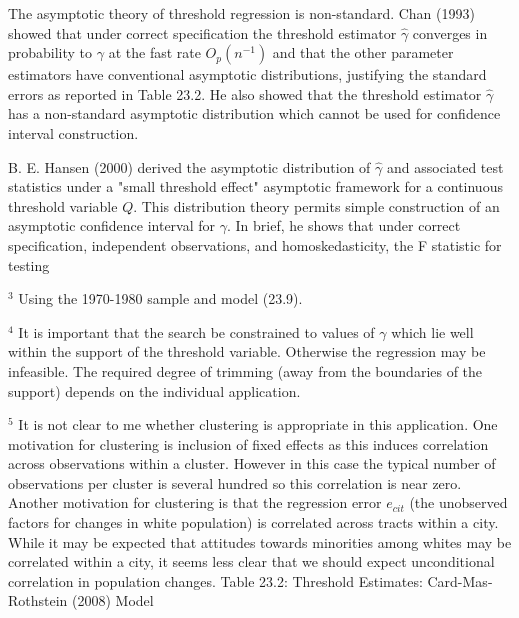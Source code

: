 \documentclass[10pt]{article}
\begin{document}
The asymptotic theory of threshold regression is non-standard. Chan (1993) showed that under correct specification the threshold estimator $\widehat{\gamma}$ converges in probability to $\gamma$ at the fast rate $O_{p}\left(n^{-1}\right)$ and that the other parameter estimators have conventional asymptotic distributions, justifying the standard errors as reported in Table 23.2. He also showed that the threshold estimator $\widehat{\gamma}$ has a non-standard asymptotic distribution which cannot be used for confidence interval construction.

B. E. Hansen (2000) derived the asymptotic distribution of $\widehat{\gamma}$ and associated test statistics under a "small threshold effect" asymptotic framework for a continuous threshold variable $Q$. This distribution theory permits simple construction of an asymptotic confidence interval for $\gamma$. In brief, he shows that under correct specification, independent observations, and homoskedasticity, the F statistic for testing

${ }^{3}$ Using the 1970-1980 sample and model (23.9).

${ }^{4}$ It is important that the search be constrained to values of $\gamma$ which lie well within the support of the threshold variable. Otherwise the regression may be infeasible. The required degree of trimming (away from the boundaries of the support) depends on the individual application.

${ }^{5}$ It is not clear to me whether clustering is appropriate in this application. One motivation for clustering is inclusion of fixed effects as this induces correlation across observations within a cluster. However in this case the typical number of observations per cluster is several hundred so this correlation is near zero. Another motivation for clustering is that the regression error $e_{c i t}$ (the unobserved factors for changes in white population) is correlated across tracts within a city. While it may be expected that attitudes towards minorities among whites may be correlated within a city, it seems less clear that we should expect unconditional correlation in population changes. Table 23.2: Threshold Estimates: Card-Mas-Rothstein (2008) Model
\end{document}
